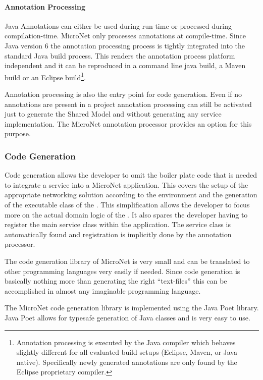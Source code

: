  \paragraph{Annotation Processing}
 
Java Annotations can either be used during run-time or processed during
compilation-time. MicroNet only processes annotations at compile-time. Since
Java version 6 the annotation processing process is tightly integrated into the
standard Java build process. This renders the annotation process platform
independent and it can be reproduced in a command line java build, a Maven build
or an Eclipse build\footnote{Annotation processing is executed by the Java compiler
which behaves slightly different for all evaluated build setups (Eclipse, Maven,
or Java native). Specifically newly generated annotations are only found by the
Eclipse proprietary compiler.}.

Annotation processing is also the entry point for code generation.
Even if no annotations are present in a project annotation processing can still
be activated just to generate the Shared Model and without generating any
service implementation. The MicroNet annotation processor provides an option for
this purpose.

\subsubsection{Code Generation}

Code generation allows the developer to omit the boiler plate code that is
needed to integrate a service into a MicroNet application. This covers the setup
of the appropriate networking solution according to the environment and the
generation of the executable class of the \ms{}. This simplification allows the
developer to focus more on the actual domain logic of the \ms{}. It also spares
the developer having to register the main service class within the
application. The service class is automatically found and registration is
implicitly done by the annotation processor.

The code generation library of MicroNet is very small and can be translated to
other programming languages very easily if needed. Since code generation is
basically nothing more than generating the right ``text-files'' this can be
accomplished in almost any imaginable programming language.

The MicroNet code generation library is implemented using the Java Poet
library. Java Poet allows for typesafe generation of Java classes and is very
easy to use. 

